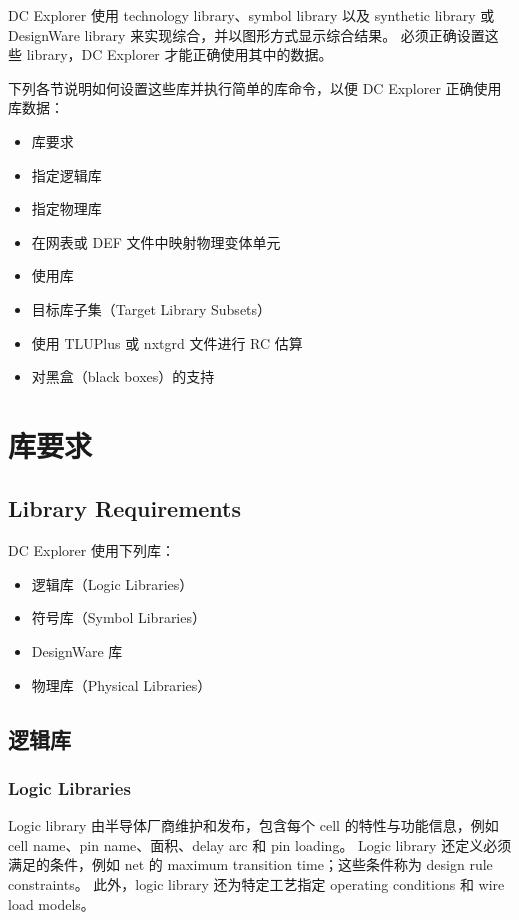 \label{chap:libs}

DC Explorer 使用 technology library、symbol library 以及 synthetic library 或 DesignWare library 来实现综合，并以图形方式显示综合结果。
必须正确设置这些 library，DC Explorer 才能正确使用其中的数据。

下列各节说明如何设置这些库并执行简单的库命令，以便 DC Explorer 正确使用库数据：
\begin{itemize}
  \item 库要求
  \item 指定逻辑库
  \item 指定物理库
  \item 在网表或 DEF 文件中映射物理变体单元
  \item 使用库
  \item 目标库子集（Target Library Subsets）
  \item 使用 TLUPlus 或 nxtgrd 文件进行 RC 估算
  \item 对黑盒（black boxes）的支持
\end{itemize}

\section{库要求}
\subsection*{Library Requirements}

DC Explorer 使用下列库：
\begin{itemize}
  \item 逻辑库（Logic Libraries）
  \item 符号库（Symbol Libraries）
  \item DesignWare 库
  \item 物理库（Physical Libraries）
\end{itemize}

\subsection{逻辑库}
\subsubsection*{Logic Libraries}

Logic library 由半导体厂商维护和发布，包含每个 cell 的特性与功能信息，例如 cell name、pin name、面积、delay arc 和 pin loading。
Logic library 还定义必须满足的条件，例如 net 的 maximum transition time；这些条件称为 design rule constraints。
此外，logic library 还为特定工艺指定 operating conditions 和 wire load models。


